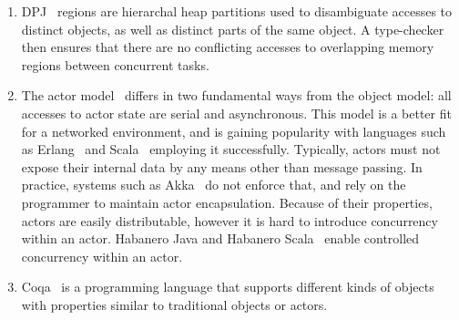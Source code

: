 \documentclass[]{usiinfprospectus}
\begin{document}
\begin{enumerate}
	\item DPJ~\cite{bocchino2009parallel} regions are hierarchal heap partitions used to disambiguate accesses to distinct objects, as well as distinct parts of the same object. A type-checker then ensures that there are no conflicting accesses to overlapping memory regions between concurrent tasks. 
	\item The actor model~\cite{agha1985actors} differs in two fundamental ways from the object model: all accesses to actor state are serial and asynchronous. This model is a better fit for a networked environment, and is gaining popularity with languages such as Erlang~\cite{armstrong1993concurrent} and Scala~\cite{odersky2004overview}  employing it successfully. Typically, actors must not expose their internal data by any means other than message passing. In practice, systems such as Akka~\cite{akka} do not enforce that, and rely on the programmer to maintain actor encapsulation. Because of their properties, actors are easily distributable, however it is hard to introduce concurrency within an actor. Habanero Java and Habanero Scala~\cite{imam2012integrating} enable controlled concurrency within an actor. 
	\item Coqa~\cite{liu2008coqa} is a programming language that supports different kinds of objects with properties similar to traditional objects or actors.
\end{enumerate}
\end{document}
